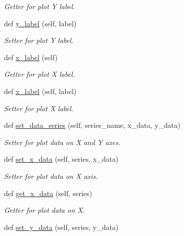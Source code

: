 \begin{DoxyCompactItemize}
\begin{DoxyCompactList}\small\item\em Getter for plot Y label. \end{DoxyCompactList}\item 
def \hyperlink{classbridges_1_1line__chart_1_1_line_chart_a13a80664727dc3302e7f7d4b29b58833}{y\+\_\+label} (self, label)
\begin{DoxyCompactList}\small\item\em Setter for plot Y label. \end{DoxyCompactList}\item 
def \hyperlink{classbridges_1_1line__chart_1_1_line_chart_a37436d14c6c63116d0d1540ea8ef7fc1}{x\+\_\+label} (self)
\begin{DoxyCompactList}\small\item\em Getter for plot X label. \end{DoxyCompactList}\item 
def \hyperlink{classbridges_1_1line__chart_1_1_line_chart_ad30576a90dcc406c46efb5902fee86f1}{x\+\_\+label} (self, label)
\begin{DoxyCompactList}\small\item\em Setter for plot X label. \end{DoxyCompactList}\item 
def \hyperlink{classbridges_1_1line__chart_1_1_line_chart_a989930527e9981b9d12cb0b56aefba76}{set\+\_\+data\+\_\+series} (self, series\+\_\+name, x\+\_\+data, y\+\_\+data)
\begin{DoxyCompactList}\small\item\em Setter for plot data on X and Y axes. \end{DoxyCompactList}\item 
def \hyperlink{classbridges_1_1line__chart_1_1_line_chart_a74651645a41825887e8775a456176eac}{set\+\_\+x\+\_\+data} (self, series, x\+\_\+data)
\begin{DoxyCompactList}\small\item\em Setter for plot data on X axis. \end{DoxyCompactList}\item 
def \hyperlink{classbridges_1_1line__chart_1_1_line_chart_af1f00a86504734b3f1a8209c66052422}{get\+\_\+x\+\_\+data} (self, series)
\begin{DoxyCompactList}\small\item\em Getter for plot data on X. \end{DoxyCompactList}\item 
def \hyperlink{classbridges_1_1line__chart_1_1_line_chart_ae5988ed81be128f96d63526560c61d9f}{set\+\_\+y\+\_\+data} (self, series, y\+\_\+data)

\end{DoxyCompactItemize}
